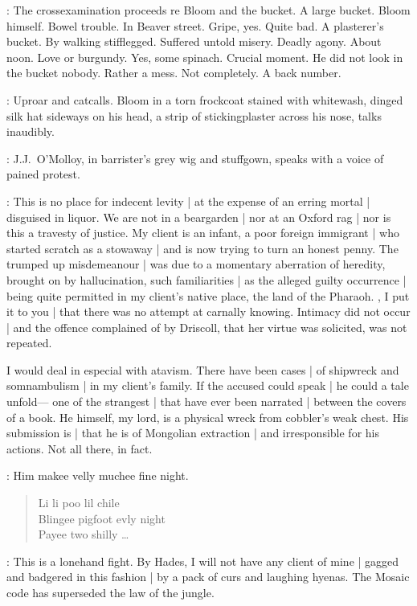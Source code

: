 :
The crossexamination proceeds re Bloom and the bucket.
A large bucket.
Bloom himself.
Bowel trouble.
In Beaver street.
Gripe,
yes.
Quite bad.
A plasterer's bucket.
By walking stifflegged.
Suffered untold misery.
Deadly agony.
About noon.
Love or burgundy.
Yes,
some spinach.
Crucial moment.
He did not look in the bucket nobody.
Rather a mess.
Not completely.
A 
back number.

:
Uproar and catcalls.
Bloom in a torn frockcoat stained with whitewash,
dinged silk hat sideways on his head,
a strip of stickingplaster across his nose,
talks inaudibly.

:
J.J.~O'Molloy,
in barrister's grey wig and stuffgown,
speaks with a voice of pained protest.

\JJOM:
This is no place for indecent levity |
at the expense of an erring mortal |
disguised in liquor.
We are not in a beargarden |
nor at an Oxford rag |
nor is this a travesty of justice.
My client is an infant,
a poor foreign immigrant |
who started scratch as a stowaway |
and is now trying to turn an honest penny.
The trumped up misdemeanour |
was due to a momentary aberration of heredity,
brought on by hallucination,
such familiarities |
as the alleged guilty occurrence |
being quite permitted in my client's native place,
the land of the Pharaoh.
,
I put it to you |
that there was no attempt at carnally knowing.
Intimacy did not occur |
and the offence complained of by Driscoll,
that her virtue was solicited,
was not repeated.

\begin{omitted}
I would deal in especial with atavism.
There have been cases |
of shipwreck and somnambulism |
in my client's family.
If the accused could speak |
he could a tale unfold---%
one of the strangest |
that have ever been narrated |
between the covers of a book.
He himself,
my lord,
is a physical wreck from cobbler's weak chest.
His submission is |
that he is of Mongolian extraction |
and irresponsible for his actions.
Not all there,
in fact.

\Bloom:
Him makee velly muchee fine night.
\begin{verse}
Li li poo lil chile\\
Blingee pigfoot evly night\\
Payee two shilly \ldots
\end{verse}


\JJOM:
This is a lonehand fight.
By Hades,
I will not have any client of mine |
gagged and badgered in this fashion |
by a pack of curs and laughing hyenas.
The Mosaic code has superseded the law of the jungle.
\end{omitted}


